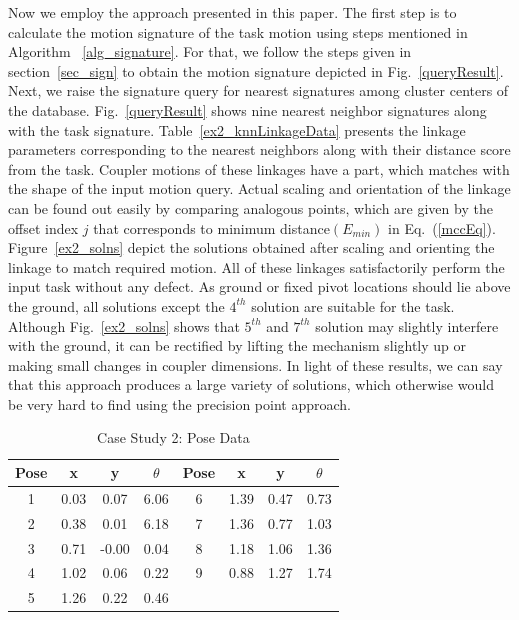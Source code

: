 \documentclass[twocolumn,10pt]{asme2ej}
\newcommand{\req}[1]{(\ref{#1})}
\begin{document}
Now we employ the approach presented in this paper.
The first step is to calculate the motion signature of the task motion using steps mentioned in Algorithm ~\ref{alg_signature}.
For that, we follow the steps given in section~\ref{sec_sign} to obtain the motion signature depicted in Fig.~\ref{queryResult}.
Next, we raise the signature query for nearest signatures among cluster centers of the database.
Fig.~\ref{queryResult} shows nine nearest neighbor signatures along with the task signature.
Table~\ref{ex2_knnLinkageData} presents the linkage parameters corresponding to the nearest neighbors along with their distance score from the task.
Coupler motions of these linkages have a part, which matches with the shape of the input motion query.
Actual scaling and orientation of the linkage can be found out easily by comparing analogous points, which are given by the offset index $j$ that corresponds to minimum distance$(E_{min})$ in Eq.~\req{mccEq}.
Figure~\ref{ex2_solns} depict the solutions obtained after scaling and orienting the linkage to match required motion.
All of these linkages satisfactorily perform the input task without any defect.
As ground or fixed pivot locations should lie above the ground, all solutions except the $4^{th}$ solution are suitable for the task.
Although Fig.~\ref{ex2_solns} shows that $5^{th}$ and $7^{th}$ solution may slightly interfere with the ground, it can be rectified by lifting the mechanism slightly up or making small changes in coupler dimensions.
In light of these results, we can say that this approach produces a large variety of solutions, which otherwise would be very hard to find using the precision point approach.


\begin{table}
\caption{Case Study 2: Pose Data}
\centering
\label{poseData}
\begin{tabular}{cccccccc}
\hline
Pose & x & y & $\theta$ & Pose & x & y & $\theta$ \\
\hline
1 & 0.03 & 0.07 & 6.06 & 6 & 1.39 & 0.47 & 0.73 \\
2 & 0.38 & 0.01 & 6.18 & 7 & 1.36 & 0.77 & 1.03 \\
3 & 0.71 &-0.00 & 0.04 & 8 & 1.18 & 1.06 & 1.36 \\
4 & 1.02 & 0.06 & 0.22 & 9 & 0.88 & 1.27 & 1.74 \\
5 & 1.26 & 0.22 & 0.46 & \\
\end{tabular}
\end{table}
\end{document}

